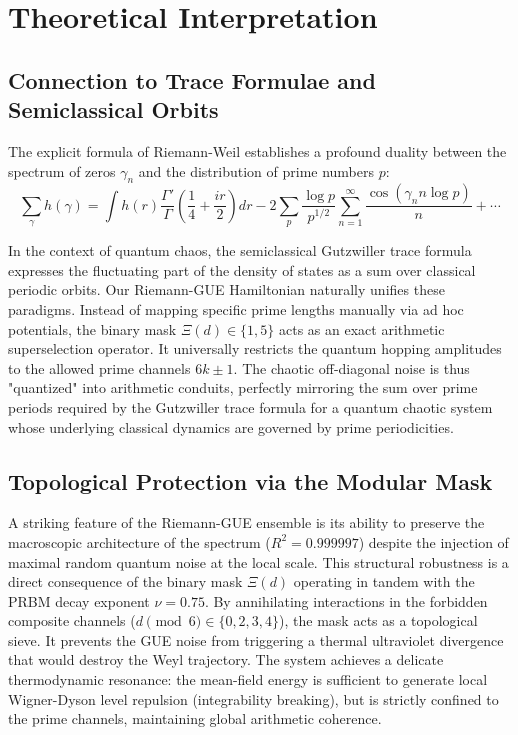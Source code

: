 \documentclass[aps,prl,preprint,superscriptaddress,floatfix]{revtex4-2}
\begin{document}
\section{Theoretical Interpretation}

\subsection{Connection to Trace Formulae and Semiclassical Orbits}

The explicit formula of Riemann-Weil establishes a profound duality between the spectrum of zeros $\gamma_n$ and the distribution of prime numbers $p$:
\begin{equation}
\sum_{\gamma} h(\gamma) = \int h(r) \frac{\Gamma'}{\Gamma}\left(\frac14 + \frac{ir}{2}\right) dr - 2\sum_{p} \frac{\log p}{p^{1/2}} \sum_{n=1}^\infty \frac{\cos(\gamma_n n\log p)}{n} + \cdots
\end{equation}

In the context of quantum chaos, the semiclassical Gutzwiller trace formula expresses the fluctuating part of the density of states as a sum over classical periodic orbits. Our Riemann-GUE Hamiltonian naturally unifies these paradigms. Instead of mapping specific prime lengths manually via ad hoc potentials, the binary mask $\Xi(d) \in \{1,5\}$ acts as an exact arithmetic superselection operator. It universally restricts the quantum hopping amplitudes to the allowed prime channels $6k\pm1$. The chaotic off-diagonal noise is thus "quantized" into arithmetic conduits, perfectly mirroring the sum over prime periods required by the Gutzwiller trace formula for a quantum chaotic system whose underlying classical dynamics are governed by prime periodicities.

\subsection{Topological Protection via the Modular Mask}

A striking feature of the Riemann-GUE ensemble is its ability to preserve the macroscopic architecture of the spectrum ($R^2 = 0.999997$) despite the injection of maximal random quantum noise at the local scale.
This structural robustness is a direct consequence of the binary mask $\Xi(d)$ operating in tandem with the PRBM decay exponent $\nu = 0.75$.
By annihilating interactions in the forbidden composite channels ($d \pmod 6 \in \{0, 2, 3, 4\}$), the mask acts as a topological sieve. It prevents the GUE noise from triggering a thermal ultraviolet divergence that would destroy the Weyl trajectory. The system achieves a delicate thermodynamic resonance: the mean-field energy is sufficient to generate local Wigner-Dyson level repulsion (integrability breaking), but is strictly confined to the prime channels, maintaining global arithmetic coherence.
\end{document}
